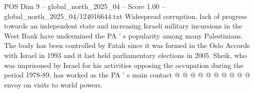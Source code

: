 \begin{textsample}{POS Dim 9 – global\_north\_2025\_04 – Score 1.00 – global\_north\_2025\_04/124016644.txt}
Widespread corruption, lack of progress towards an independent state and increasing Israeli military incursions in the West Bank have undermined the PA ' s popularity among many Palestinians.
The body has been controlled by Fatah since it was formed in the Oslo Accords with Israel in 1993 and it last held parliamentary elections in 2005.
Sheik, who was imprisoned by Israel for his activities opposing the occupation during the period 1978-89, has worked as the PA ' s main contact @ @ @ @ @ @ @ @ @ @ envoy on visits to world powers.

\end{textsample}
